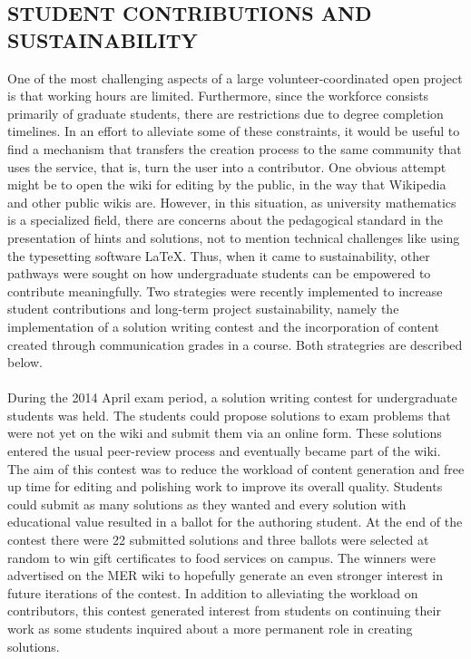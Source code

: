 \documentclass{primus}
\begin{document}
\subsection{STUDENT CONTRIBUTIONS AND SUSTAINABILITY}\label{sec:Student_Contributions_and_Sustainability}
One of the most challenging aspects of a large volunteer-coordinated open project is that working hours are limited. Furthermore, since the workforce consists primarily of graduate students, there are restrictions due to degree completion timelines. In an effort to alleviate some of these constraints, it would be useful to find a mechanism that transfers the creation process to the same community that uses the service, that is, turn the user into a contributor. One obvious attempt might be to open the wiki for editing by the public, in the way that Wikipedia and other public wikis are. However, in this situation, as university mathematics is a specialized field, there are concerns about the pedagogical standard in the presentation of hints and solutions, not to mention technical challenges like using the typesetting software LaTeX. Thus, when it came to sustainability, other pathways were sought on how undergraduate students can be empowered to contribute meaningfully. Two strategies were recently implemented to increase student contributions and long-term project sustainability, namely the implementation of a solution writing contest and the incorporation of content created through communication grades in a course.  Both strategries are described below.
\\\\
\noindent{}During the 2014 April exam period, a solution writing contest for undergraduate students was held. The students could propose solutions to exam problems that were not yet on the wiki and submit them via an online form. These solutions entered the usual peer-review process and eventually became part of the wiki. The aim of this contest was to reduce the workload of content generation and free up time for editing and polishing work to improve its overall quality. Students could submit as many solutions as they wanted and every solution with educational value resulted in a ballot for the authoring student. At the end of the contest there were 22 submitted solutions and three ballots were selected at random to win gift certificates to food services on campus. The winners were advertised on the MER wiki to hopefully generate an even stronger interest in future iterations of the contest. In addition to alleviating the workload on contributors, this contest generated interest from students on continuing their work as some students inquired about a more permanent role in creating solutions.
\end{document}
